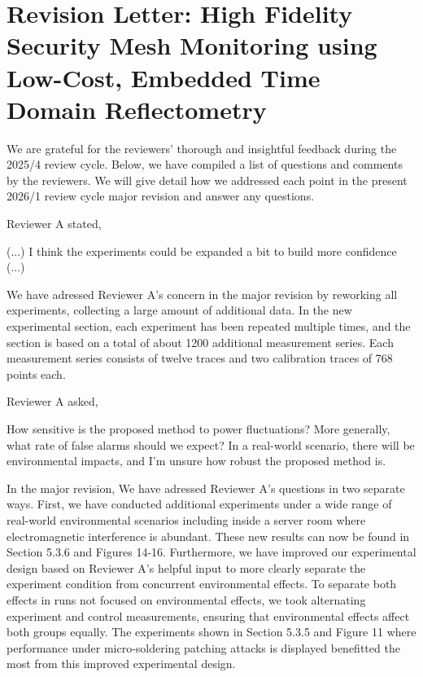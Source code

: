 \documentclass[a4paper, 10pt]{article}
\begin{document}
\section*{Revision Letter: High Fidelity Security Mesh Monitoring using Low-Cost, Embedded Time Domain Reflectometry}
\vspace*{10mm}

We are grateful for the reviewers' thorough and insightful feedback during the 2025/4 review cycle. Below, we have
compiled a list of questions and comments by the reviewers. We will give detail how we addressed each point in the
present 2026/1 review cycle major revision and answer any questions.

Reviewer A stated,
\begin{displayquote}
    (...) I think the experiments could be expanded a bit to build more confidence (...)
\end{displayquote}

We have adressed Reviewer A's concern in the major revision by reworking all experiments, collecting a large amount of
additional data. In the new experimental section, each experiment has been repeated multiple times, and the section is
based on a total of about 1200 additional measurement series. Each measurement series consists of twelve traces and two
calibration traces of 768 points each.

Reviewer A asked,
\begin{displayquote}
    How sensitive is the proposed method to power fluctuations? More generally, what rate of false alarms should we
    expect? In a real-world scenario, there will be environmental impacts, and I'm unsure how robust the proposed method
    is.
\end{displayquote}

In the major revision, We have adressed Reviewer A's questions in two separate ways. First, we have conducted additional
experiments under a wide range of real-world environmental scenarios including inside a server room where
electromagnetic interference is abundant. These new results can now be found in Section 5.3.6 and Figures 14-16.
Furthermore, we have improved our experimental design based on Reviewer A's helpful input to more clearly separate the
experiment condition from concurrent environmental effects. To separate both effects in runs not focused on
environmental effects, we took alternating experiment and control measurements, ensuring that environmental effects
affect both groups equally. The experiments shown in Section 5.3.5 and Figure 11 where performance under
micro-soldering patching attacks is displayed benefitted the most from this improved experimental design.
\end{document}
